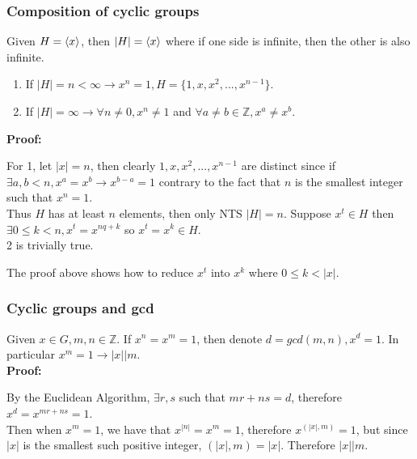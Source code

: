 \documentclass{article}
\begin{document}
\subsubsection*{Composition of cyclic groups}
Given $H = \braket{x}$, then $|H| = \braket{x}$ where if one side is infinite, then the other is also infinite.
\begin{enumerate}
    \item If $|H| = n < \infty \rightarrow x^n = 1, H = \{1, x, x^2, ..., x^{n-1}\}$.
    \item If $|H| = \infty \rightarrow \forall n \neq 0, x^n \neq 1$ and $\forall a\neq b \in \mathbb{Z}, x^a \neq x^b$.
\end{enumerate}
\textbf{Proof:}
\begin{addmargin}[1em]{0em}
    For 1, let $|x| = n$, then clearly $1, x, x^2, ..., x^{n-1}$ are distinct since if $\exists a, b < n, x^a = x^b \rightarrow x^{b-a} = 1$ contrary to the fact that $n$ is the smallest integer such that $x^n = 1$.\\
    Thus $H$ has at least $n$ elements, then only NTS $|H| = n$. Suppose $x^t \in H$ then $\exists 0 \leq k < n, x^t = x^{nq+k}$ so $x^t = x^k \in H$.\\
    2 is trivially true.
\end{addmargin}
The proof above shows how to reduce $x^t$ into $x^k$ where $0 \leq k < |x|$.
\subsubsection*{Cyclic groups and gcd}
Given $x \in G, m, n \in \mathbb{Z}$. If $x^n = x^m = 1$, then denote $d = gcd(m, n), x^d = 1$. In particular $x^m = 1 \rightarrow |x||m$.\\
\textbf{Proof:}
\begin{addmargin}[1em]{0em}
    By the Euclidean Algorithm, $\exists r, s$ such that $mr+ns = d$, therefore $x^d = x^{mr+ns} = 1$.\\
    Then when $x^m = 1$, we have that $x^{|n|} = x^m = 1$, therefore $x^{(|x|, m)} = 1$, but since $|x|$ is the smallest such positive integer, $(|x|, m) = |x|$. Therefore $|x||m$.
\end{addmargin}
\end{document}
